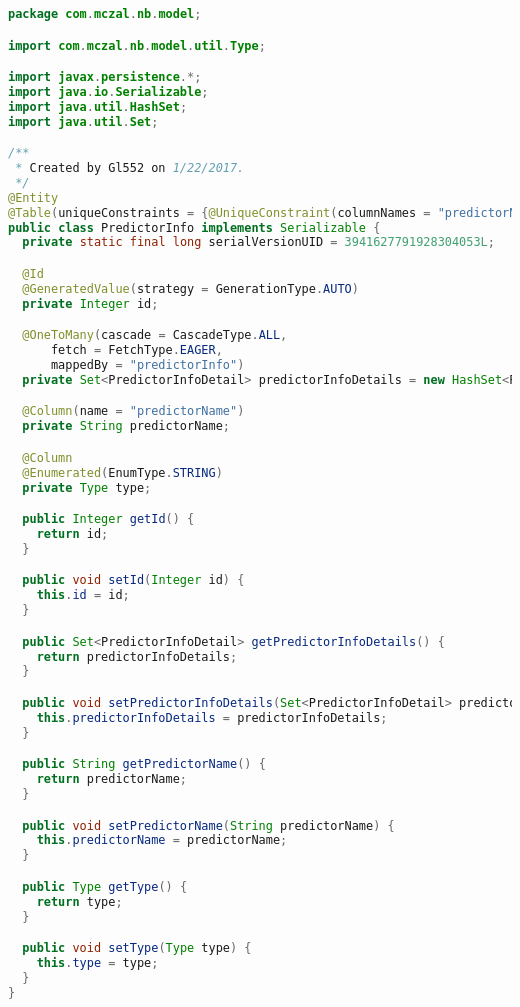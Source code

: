 \begin{lstlisting}[language=Java,basicstyle=\tiny,caption=PredictorInfo.java]
package com.mczal.nb.model;

import com.mczal.nb.model.util.Type;

import javax.persistence.*;
import java.io.Serializable;
import java.util.HashSet;
import java.util.Set;

/**
 * Created by Gl552 on 1/22/2017.
 */
@Entity
@Table(uniqueConstraints = {@UniqueConstraint(columnNames = "predictorName")})
public class PredictorInfo implements Serializable {
  private static final long serialVersionUID = 3941627791928304053L;

  @Id
  @GeneratedValue(strategy = GenerationType.AUTO)
  private Integer id;

  @OneToMany(cascade = CascadeType.ALL,
      fetch = FetchType.EAGER,
      mappedBy = "predictorInfo")
  private Set<PredictorInfoDetail> predictorInfoDetails = new HashSet<PredictorInfoDetail>();

  @Column(name = "predictorName")
  private String predictorName;

  @Column
  @Enumerated(EnumType.STRING)
  private Type type;

  public Integer getId() {
    return id;
  }

  public void setId(Integer id) {
    this.id = id;
  }

  public Set<PredictorInfoDetail> getPredictorInfoDetails() {
    return predictorInfoDetails;
  }

  public void setPredictorInfoDetails(Set<PredictorInfoDetail> predictorInfoDetails) {
    this.predictorInfoDetails = predictorInfoDetails;
  }

  public String getPredictorName() {
    return predictorName;
  }

  public void setPredictorName(String predictorName) {
    this.predictorName = predictorName;
  }

  public Type getType() {
    return type;
  }

  public void setType(Type type) {
    this.type = type;
  }
}

\end{lstlisting}


